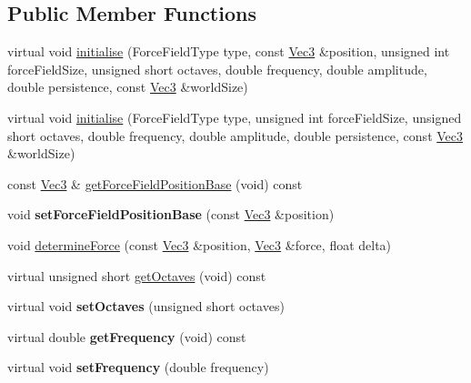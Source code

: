 \subsection*{Public Member Functions}
\begin{DoxyCompactItemize}
\item 
virtual void \hyperlink{classPUForceField_a1f61f55760c564ae61d4a53c46ce21a2}{initialise} (Force\+Field\+Type type, const \hyperlink{classVec3}{Vec3} \&position, unsigned int force\+Field\+Size, unsigned short octaves, double frequency, double amplitude, double persistence, const \hyperlink{classVec3}{Vec3} \&world\+Size)
\item 
virtual void \hyperlink{classPUForceField_a86c5e8c03d61ec27c5bedaa0c19d0092}{initialise} (Force\+Field\+Type type, unsigned int force\+Field\+Size, unsigned short octaves, double frequency, double amplitude, double persistence, const \hyperlink{classVec3}{Vec3} \&world\+Size)
\item 
const \hyperlink{classVec3}{Vec3} \& \hyperlink{classPUForceField_a1af8837a7ef5227d5d163ae8f145b0c3}{get\+Force\+Field\+Position\+Base} (void) const
\item 
\mbox{\label{classPUForceField_abe7dca4bb32ed3ced61382aa65c89c95}} 
void {\bfseries set\+Force\+Field\+Position\+Base} (const \hyperlink{classVec3}{Vec3} \&position)
\item 
void \hyperlink{classPUForceField_a08d8c55f04d849d4232d36a41bfb543e}{determine\+Force} (const \hyperlink{classVec3}{Vec3} \&position, \hyperlink{classVec3}{Vec3} \&force, float delta)
\item 
virtual unsigned short \hyperlink{classPUForceField_a7cbdc36933771481af70f808e3975886}{get\+Octaves} (void) const
\item 
\mbox{\label{classPUForceField_ad37b88b7083d7f2d1a153f02069aa8cd}} 
virtual void {\bfseries set\+Octaves} (unsigned short octaves)
\item 
\mbox{\label{classPUForceField_ae7a4bf084e4bd2990caf5f04ac0d4585}} 
virtual double {\bfseries get\+Frequency} (void) const
\item 
\mbox{\label{classPUForceField_a95023a6a1503c554c486f72da6681828}} 
virtual void {\bfseries set\+Frequency} (double frequency)
\item 
\mbox{\label{classPUForceField_a97a9e9bde187a14e815d79d7ebb2532b}} 

\end{DoxyCompactItemize}
